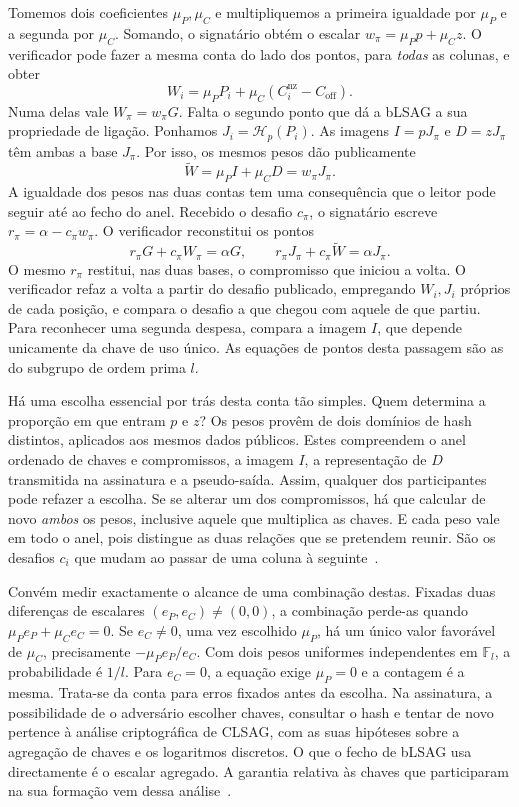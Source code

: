 Tomemos dois coeficientes \(\mu_P,\mu_C\) e multipliquemos a primeira
igualdade por \(\mu_P\) e a segunda por \(\mu_C\). Somando, o signatário
obtém o escalar \(w_\pi=\mu_Pp+\mu_Cz\). O verificador pode fazer a
mesma conta do lado dos pontos, para \emph{todas} as colunas, e obter
\[
 W_i=\mu_PP_i+\mu_C(C_i^{\mathrm{nz}}-C_{\mathrm{off}}).
\]
Numa delas vale \(W_\pi=w_\pi G\). Falta o segundo ponto que dá a
bLSAG a sua propriedade de ligação. Ponhamos \(J_i=\mathcal H_p(P_i)\).
As imagens \(I=pJ_\pi\) e \(D=zJ_\pi\) têm ambas a base \(J_\pi\).
Por isso, os mesmos pesos dão publicamente
\[
 \widetilde W=\mu_PI+\mu_CD=w_\pi J_\pi .
\]
A igualdade dos pesos nas duas contas tem uma consequência que o leitor
pode seguir até ao fecho do anel. Recebido o desafio \(c_\pi\), o
signatário escreve \(r_\pi=\alpha-c_\pi w_\pi\). O verificador
reconstitui os pontos
\[
 r_\pi G+c_\pi W_\pi=\alpha G,\qquad
 r_\pi J_\pi+c_\pi\widetilde W=\alpha J_\pi.
\]
O mesmo \(r_\pi\) restitui, nas duas bases, o compromisso que iniciou
a volta. O verificador refaz a volta a partir do desafio publicado,
empregando \(W_i,J_i\) próprios de cada posição, e compara o desafio
a que chegou com aquele de que partiu. Para reconhecer uma segunda
despesa, compara a imagem \(I\), que depende unicamente da chave de
uso único. As equações de pontos desta passagem são as do subgrupo
de ordem prima \(l\).

Há uma escolha essencial por trás desta conta tão simples. Quem determina
a proporção em que entram \(p\) e \(z\)? Os pesos provêm de dois domínios
de hash distintos, aplicados aos mesmos dados públicos. Estes compreendem
o anel ordenado de chaves e compromissos, a imagem \(I\), a representação
de \(D\) transmitida na assinatura e a pseudo-saída. Assim, qualquer dos
participantes pode refazer a escolha. Se se alterar um dos compromissos,
há que calcular de novo \emph{ambos} os pesos, inclusive aquele que
multiplica as chaves. E cada peso vale em todo o anel, pois distingue
as duas relações que se pretendem reunir. São os desafios \(c_i\) que
mudam ao passar de uma coluna à seguinte~\cite{MRL-0011-CLSAG}.

Convém medir exactamente o alcance de uma combinação destas. Fixadas
duas diferenças de escalares \((e_P,e_C)\ne(0,0)\), a combinação
perde-as quando \(\mu_Pe_P+\mu_Ce_C=0\). Se \(e_C\ne0\), uma vez
escolhido \(\mu_P\), há um único valor favorável de \(\mu_C\),
precisamente \(-\mu_Pe_P/e_C\). Com dois pesos uniformes independentes
em \(\mathbb F_l\), a probabilidade é \(1/l\). Para \(e_C=0\), a
equação exige \(\mu_P=0\) e a contagem é a mesma. Trata-se da conta
para erros fixados antes da escolha. Na assinatura, a possibilidade de
o adversário escolher chaves, consultar o hash e tentar de novo pertence
à análise criptográfica de CLSAG, com as suas hipóteses sobre a
agregação de chaves e os logaritmos discretos. O que o fecho de bLSAG
usa directamente é o escalar agregado. A garantia relativa às chaves
que participaram na sua formação vem dessa análise~\cite{MRL-0011-CLSAG}.

